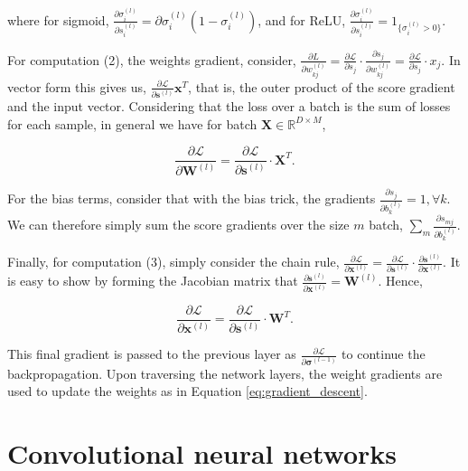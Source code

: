 where for sigmoid, $\frac{\partial\sigma_i^{(l)}}{\partial{s}_i^{(l)}} = \partial\sigma_i^{(l)}(1 - \sigma_i^{(l)})$, and for ReLU, $\frac{\partial\sigma_i^{(l)}}{\partial{s}_i^{(l)}} = 1_{\{\sigma_i^{(l)} > 0\}}$.

For computation (2), the weights gradient, consider, $\frac{\partial L}{\partial w_{kj}^{(l)}} = \frac{\partial\mathcal{L}}{\partial s_j}\cdot\frac{\partial s_j}{\partial w_{kj}^{(l)}} = \frac{\partial\mathcal{L}}{\partial s_j}\cdot x_j$. In vector form this gives us, $\frac{\partial\mathcal{L}}{\partial \mathbf{s}^{(l)}}\mathbf{x}^T$, that is, the outer product of the score gradient and the input vector. Considering that the loss over a batch is the sum of losses for each sample, in general we have for batch $\mathbf{X} \in \mathbb{R}^{D \times M}$,

\begin{equation}
\frac{\partial\mathcal{L}}{\partial \mathbf{W}^{(l)}} = \frac{\partial\mathcal{L}}{\partial \mathbf{s}^{(l)}}\cdot\mathbf{X}^T.
\label{eq:backprop_weights}
\end{equation}

For the bias terms, consider that with the bias trick, the gradients $\frac{\partial s_j}{\partial b_{k}^{(l)}} = 1, \forall k$. We can therefore simply sum the score gradients over the size $m$ batch, $\sum_m\frac{\partial s_{mj}}{\partial b_{k}^{(l)}}$. 

Finally, for computation (3), simply consider the chain rule, $\frac{\partial\mathcal{L}}{\partial\mathbf{x}^{(l)}} = \frac{\partial\mathcal{L}}{\partial\mathbf{s}^{(l)}}\cdot\frac{\partial\mathbf{s}^{(l)}}{\partial\mathbf{x}^{(l)}}.$ It is easy to show by forming the Jacobian matrix that $\frac{\partial\mathbf{s}^{(l)}}{\partial\mathbf{x}^{(l)}} = \mathbf{W}^{(l)}$. Hence,

\begin{equation}
\frac{\partial\mathcal{L}}{\partial \mathbf{x}^{(l)}} = \frac{\partial\mathcal{L}}{\partial \mathbf{s}^{(l)}}\cdot\mathbf{W}^T.
\label{eq:backprop_activations}
\end{equation}

This final gradient is passed to the previous layer as $\frac{\partial\mathcal{L}}{\partial \boldsymbol{\sigma}^{(l-1)}}$ to continue the backpropagation. Upon traversing the network layers, the weight gradients are used to update the weights as in Equation \ref{eq:gradient_descent}.

\section{Convolutional neural networks}
\label{sec:convolutional_neural_networks}

